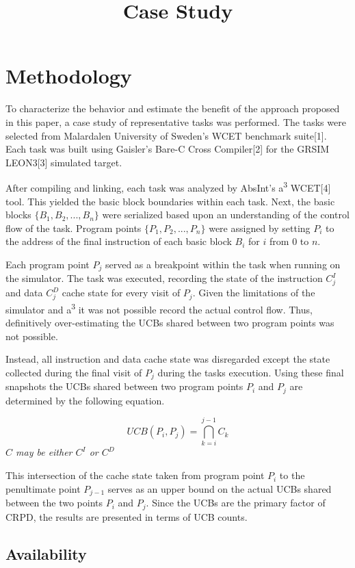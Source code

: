 \documentclass[12pt]{article}
\title{Case Study}
\begin{document}
\section{Methodology}

To characterize the behavior and estimate the benefit of the approach
proposed in this paper, a case study of representative tasks was
performed. The tasks were selected from Malardalen University of
Sweden's WCET benchmark suite[1]. Each task was built using Gaisler's
Bare-C Cross Compiler[2] for the GRSIM LEON3[3] simulated target. 

After compiling and linking, each task was analyzed by AbsInt's
a\textsuperscript{3} WCET[4] tool. This yielded the basic block
boundaries within each task. Next, the basic blocks
${\{B_1, B_2, ..., B_n\}}$ were serialized based upon an understanding of
the control flow of the task. Program points
${\{P_1, P_2, ..., P_n\}}$ were assigned by setting ${P_i}$ to the
address of the final instruction of each basic block ${B_i}$ for ${i}$
from ${0}$ to ${n}$.

Each program point ${P_j}$ served as a breakpoint within the task when
running on the simulator. The task was executed, recording the state of
the instruction ${C^I_j}$ and data ${C^D_j}$ cache state for every
visit of ${P_j}$. Given the limitations of the simulator and
a\textsuperscript{3} it was not possible record the actual control
flow. Thus, definitively over-estimating the UCBs shared between two
program points was not possible.

Instead, all instruction and data cache state was disregarded except
the state collected during the final visit of ${P_j}$ during the tasks
execution. Using these final snapshots the UCBs shared between two
program points ${P_i}$ and ${P_j}$ are determined by the following
equation. 
\begin{center}
  \begin{equation*}
    UCB(P_i, P_j) = \bigcap_{k=i}^{j-1} C_k
  \end{equation*}
  \emph{${C}$ may be either ${C^I}$ or ${C^D}$}
\end{center}

This intersection of the cache state taken from program point ${P_i}$
to the penultimate point ${P_{j-1}}$ serves as an upper bound on the
actual UCBs shared between the two points ${P_i}$ and ${P_j}$. Since
the UCBs are the primary factor of CRPD, the results are presented in
terms of UCB counts.

\subsection{Availability}
\end{document}
